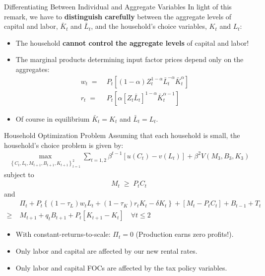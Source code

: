 \documentclass[10pt,c,aspectratio=1610,handout]{beamer}
\begin{document}
\begin{frame}{Differentiating Between Individual and Aggregate Variables}%
  In light of this remark, we have to \textbf{distinguish carefully} between the aggregate levels of capital and labor, $\bar{K}_{t}$ and $\bar{L}_{t}$, and the household's choice variables, $K_t$ and $L_t$:%
  \vspace*{0.15in}%
  \pause%
  \begin{itemize}%
    \item[$\blacktriangleright$] The household \textbf{cannot control the aggregate levels} of capital and labor!%
    \vspace*{0.2in}%
    \pause%
    \item[$\blacktriangleright$] The marginal products determining input factor prices depend only on the aggregates:%
    \begin{align*}%
      w_{t} \; = & \; P_{t} \left[ (1-\alpha) Z_{t}^{1-\alpha} \bar{L}_{t}^{-\alpha} \bar{K}_{t}^{\alpha} \right]\\%
      r_{t} \; = & \; P_{t} \left[ \alpha \left[ Z_{t} \bar{L}_{t} \right]^{1-\alpha} \bar{K}_{t}^{\alpha-1} \right]%
    \end{align*}%
    \vspace*{-0.1in}%
    \pause%
    \item[$\blacktriangleright$] Of course in equilibrium $\bar{K}_{t}=K_{t}$ and $\bar{L}_{t}=L_{t}$.%
  \end{itemize}%
\end{frame}%
\begin{frame}{Household Optimization Problem}%
  Assuming that each household is small, the household's choice problem is given by:%
  \begin{align*}%
    \max_{\left\{ C_{t}, L_{t}, M_{t+1}, B_{t+1}, K_{t+1} \right\}_{t=1}^{2}} \sum_{t=1,2}\beta^{t-1} \left[ u(C_{t})-v(L_{t}) \right] + \beta^{2}V(M_{3},B_{3},K_{3})%
  \end{align*}%
  subject to%
  \begin{align*}%
    M_{t} \; \geq \; P_{t} C_{t}%
  \end{align*}%
  and%
  \begin{align*}%
    & \Pi_t + P_{t} \left\{ (1-\tau_L) w_t L_{t} + (1-\tau_K) r_t K_{t} - \delta K_{t} \right\} +\left[ M_{t} - P_{t} C_{t} \right] + B_{t-1} + T_{t}\\%
    \geq \; & M_{t+1} + q_{t} B_{t+1} + P_{t} \left[ K_{t+1} - K_{t} \right] \quad \forall t\leq 2%
  \end{align*}%
  \begin{itemize}%
    \item[$\blacktriangleright$] With constant-returns-to-scale: $\Pi_t = 0$ (Production earns zero profits!).%
    \item[$\blacktriangleright$] Only labor and capital are affected by our new rental rates.%
    \item[$\blacktriangleright$] Only labor and capital FOCs are affected by the tax policy variables.%
  \end{itemize}%
\end{frame}%
\end{document}
